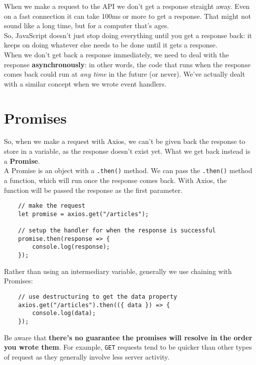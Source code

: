 When we make a request to the API we don't get a response straight away. Even on a fast connection it can take 100ms or more to get a response. That might not sound like a long time, but for a computer that's ages.
\\

So, JavaScript doesn't just stop doing everything until you get a response back: it keeps on doing whatever else needs to be done until it gets a response.
\\

When we don't get back a response immediately, we need to deal with the response \textbf{asynchronously}: in other words, the code that runs when the response comes back could run at \textit{any time} in the future (or never).  We've actually dealt with a similar concept when we wrote event handlers.


\section{Promises}

So, when we make a request with Axios, we can't be given back the response to store in a variable, as the response doesn't exist yet. What we get back instead is a \textbf{Promise}.
\\

A Promise is an object with a \texttt{.then()} method. We can pass the \texttt{.then()} method a function, which will run once the response comes back. With Axios, the function will be passed the response as the first parameter.

\begin{verbatim}
    // make the request
    let promise = axios.get("/articles");

    // setup the handler for when the response is successful
    promise.then(response => {
        console.log(response);
    });
\end{verbatim}

Rather than using an intermediary variable, generally we use chaining with Promises:

\begin{verbatim}
    // use destructuring to get the data property
    axios.get("/articles").then(({ data }) => {
        console.log(data);
    });
\end{verbatim}

Be aware that \textbf{there's no guarantee the promises will resolve in the order you wrote them}. For example, \texttt{GET} requests tend to be quicker than other types of request as they generally involve less server activity.


